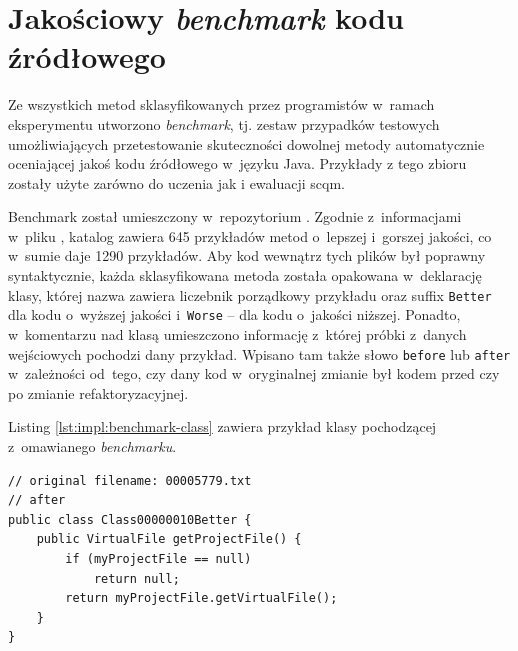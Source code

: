 \documentclass[twoside]{praca}
\begin{document}
\section{Jakościowy \textit{benchmark} kodu źródłowego}
\label{sec:impl:benchmark}

Ze wszystkich metod sklasyfikowanych przez programistów w~ramach eksperymentu utworzono \textit{benchmark}, tj. zestaw przypadków testowych umożliwiających przetestowanie skuteczności dowolnej metody automatycznie oceniającej jakoś kodu źródłowego w~języku Java. Przykłady z tego zbioru zostały użyte zarówno do uczenia jak i ewaluacji \gls{scqm}.

Benchmark został umieszczony w~repozytorium \cite{fracz:benchmark}. Zgodnie z~informacjami w~pliku , katalog  zawiera 645 przykładów metod o~lepszej i~gorszej jakości, co w~sumie daje 1290 przykładów. Aby kod wewnątrz tych plików był poprawny syntaktycznie, każda sklasyfikowana metoda została opakowana w~deklarację klasy, której nazwa zawiera liczebnik porządkowy przykładu oraz suffix \texttt{Better} dla kodu o~wyższej jakości i~\texttt{Worse} -- dla kodu o~jakości niższej. Ponadto, w~komentarzu nad klasą umieszczono informację z~której próbki z~danych wejściowych pochodzi dany przykład. Wpisano tam także słowo \texttt{before} lub \texttt{after} w~zależności od~tego, czy dany kod w~oryginalnej zmianie był kodem przed czy po zmianie refaktoryzacyjnej.

Listing \ref{lst:impl:benchmark-class} zawiera przykład klasy pochodzącej z~omawianego \textit{benchmarku}.

\begin{lstlisting}[frame=single,caption={Przykładowa klasa wchodząca w~skład jakościowego \textit{benchmarku} kodu źródłowego},captionpos=b,label={lst:impl:benchmark-class}]
// original filename: 00005779.txt
// after
public class Class00000010Better {
    public VirtualFile getProjectFile() {
        if (myProjectFile == null)
            return null;
        return myProjectFile.getVirtualFile();
    }
}
\end{lstlisting}
\end{document}
